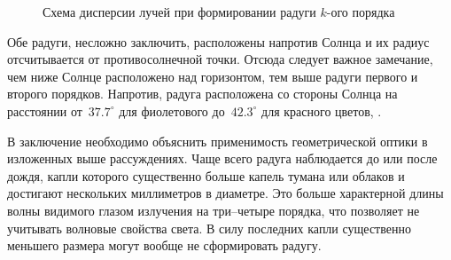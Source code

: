 \begin{figure}[h!]
    \begin{subfigure}{0.3\tw}
        \centering
        \label{pic:rainbow-disp-1}
    \end{subfigure}
    \hfill
    \begin{subfigure}{0.3\tw}
        \centering
        \label{pic:rainbow-disp-2}
    \end{subfigure}
    \hfill
    \begin{subfigure}{0.3\tw}
        \centering
        \label{pic:rainbow-disp-3}
    \end{subfigure}
    \caption{Схема дисперсии лучей при формировании радуги $k$-ого порядка}
\end{figure}

Обе радуги, несложно заключить, расположены напротив Солнца и их радиус отсчитывается от противосолнечной точки. Отсюда следует важное замечание, чем ниже Солнце расположено над горизонтом, тем выше радуги первого и второго порядков. Напротив,  радуга расположена со стороны Солнца на расстоянии от~$37.7^\circ$ для фиолетового до~$42.3^\circ$ для красного цветов, .

В заключение необходимо объяснить применимость геометрической оптики в изложенных выше рассуждениях. Чаще всего радуга наблюдается до или после дождя, капли которого существенно больше капель тумана или облаков и достигают нескольких миллиметров в диаметре. Это больше характерной длины волны видимого глазом излучения на три--четыре порядка, что позволяет не учитывать волновые свойства света. В силу последних капли существенно меньшего размера могут вообще не сформировать радугу. 